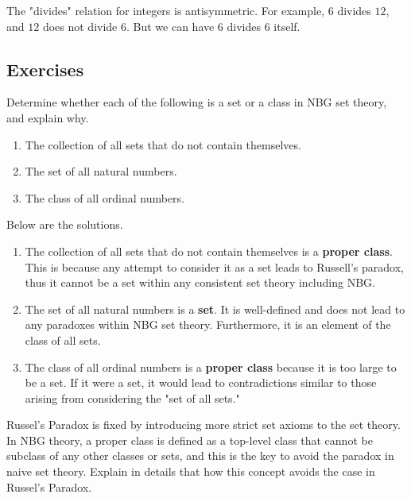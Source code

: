 \begin{example}
	The "divides" relation for integers is antisymmetric. For example, \( 6 \) divides \( 12 \), and \( 12 \) does not divide \( 6 \). But we can have 6 divides 6 itself.
\end{example}
\subsection{Exercises}



\begin{exercise}
	 Determine whether each of the following is a set or a class in NBG set theory, and explain why.
	\begin{enumerate}
		\item The collection of all sets that do not contain themselves.
		\item The set of all natural numbers.
		\item The class of all ordinal numbers.
	\end{enumerate}
\end{exercise}
\begin{solution}
	Below are the solutions.
	\begin{enumerate}
		\item The collection of all sets that do not contain themselves is a \textbf{proper class}. This is because any attempt to consider it as a set leads to Russell's paradox, thus it cannot be a set within any consistent set theory including NBG.
		\item The set of all natural numbers is a \textbf{set}. It is well-defined and does not lead to any paradoxes within NBG set theory. Furthermore, it is an element of the class of all sets.
		\item The class of all ordinal numbers is a \textbf{proper class} because it is too large to be a set. If it were a set, it would lead to contradictions similar to those arising from considering the "set of all sets."
	\end{enumerate}
\end{solution}
\begin{exercise}
    Russel's Paradox is fixed by introducing more strict set axioms to the set theory. In NBG theory, a
    proper class is defined as a top-level class that cannot be subclass of any other classes or sets, and
    this is the key to avoid the paradox in naive set theory. Explain in details that how 
    this concept avoids the case in Russel's Paradox.
\end{exercise}
